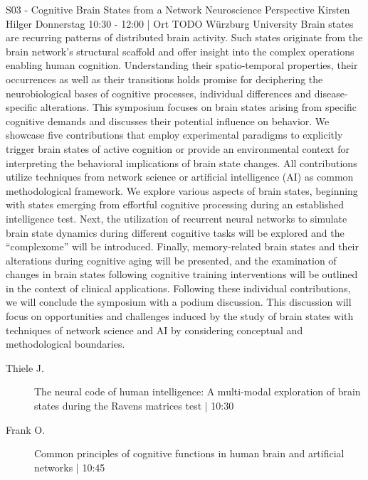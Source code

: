 
            \begin{symposium}
            {S03 - Cognitive Brain States from a Network Neuroscience Perspective }
            {Kirsten Hilger}
            {Donnerstag 10:30 - 12:00 | Ort TODO}
            {Würzburg University}
            Brain states are recurring patterns of distributed brain activity. Such states originate from the brain network's structural scaffold and offer insight into the complex operations enabling human cognition. Understanding their spatio-temporal properties, their occurrences as well as their transitions holds promise for deciphering the neurobiological bases of cognitive processes, individual differences and disease-specific alterations.
This symposium focuses on brain states arising from specific cognitive demands and discusses their potential influence on behavior. We showcase five contributions that employ experimental paradigms to explicitly trigger brain states of active cognition or provide an environmental context for interpreting the behavioral implications of brain state changes. All contributions utilize techniques from network science or artificial intelligence (AI) as common methodological framework.
We explore various aspects of brain states, beginning with states emerging from effortful cognitive processing during an established intelligence test. Next, the utilization of recurrent neural networks to simulate brain state dynamics during different cognitive tasks will be explored and the “complexome” will be introduced. Finally, memory-related brain states and their alterations during cognitive aging will be presented, and the examination of changes in brain states following cognitive training interventions will be outlined in the context of clinical applications.
Following these individual contributions, we will conclude the symposium with a podium discussion. This discussion will focus on opportunities and challenges induced by the study of brain states with techniques of network science and AI by considering conceptual and methodological boundaries.
            \begin{description}    
            
                \item [ Thiele J.] The neural code of human intelligence: A multi-modal exploration of brain states during the Ravens matrices test \textcolor{mygray}{ | 10:30}    
                
                \item [ Frank O.] Common principles of cognitive functions in human brain and artificial networks  \textcolor{mygray}{ | 10:45}    
                

\end{description}
\end{symposium}
